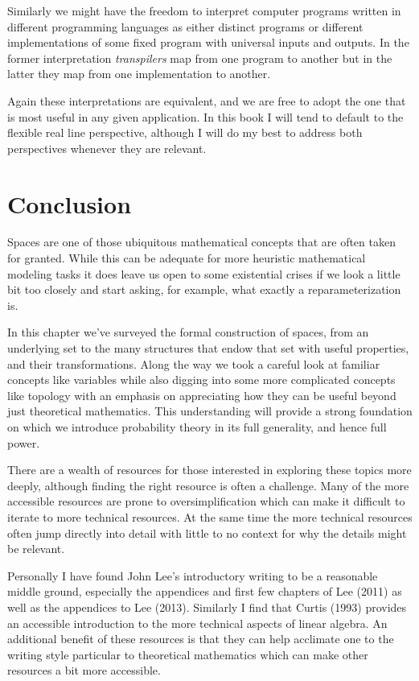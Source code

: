 \documentclass[
  letterpaper,
  DIV=11,
  numbers=noendperiod]{scrartcl}
\begin{document}
Similarly we might have the freedom to interpret computer programs
written in different programming languages as either distinct programs
or different implementations of some fixed program with universal inputs
and outputs. In the former interpretation \emph{transpilers} map from
one program to another but in the latter they map from one
implementation to another.

Again these interpretations are equivalent, and we are free to adopt the
one that is most useful in any given application. In this book I will
tend to default to the flexible real line perspective, although I will
do my best to address both perspectives whenever they are relevant.

\hypertarget{conclusion}{%
\section{Conclusion}\label{conclusion}}

Spaces are one of those ubiquitous mathematical concepts that are often
taken for granted. While this can be adequate for more heuristic
mathematical modeling tasks it does leave us open to some existential
crises if we look a little bit too closely and start asking, for
example, what exactly a reparameterization is.

In this chapter we've surveyed the formal construction of spaces, from
an underlying set to the many structures that endow that set with useful
properties, and their transformations. Along the way we took a careful
look at familiar concepts like variables while also digging into some
more complicated concepts like topology with an emphasis on appreciating
how they can be useful beyond just theoretical mathematics. This
understanding will provide a strong foundation on which we introduce
probability theory in its full generality, and hence full power.

There are a wealth of resources for those interested in exploring these
topics more deeply, although finding the right resource is often a
challenge. Many of the more accessible resources are prone to
oversimplification which can make it difficult to iterate to more
technical resources. At the same time the more technical resources often
jump directly into detail with little to no context for why the details
might be relevant.

Personally I have found John Lee's introductory writing to be a
reasonable middle ground, especially the appendices and first few
chapters of Lee (2011) as well as the appendices to Lee (2013).
Similarly I find that Curtis (1993) provides an accessible introduction
to the more technical aspects of linear algebra. An additional benefit
of these resources is that they can help acclimate one to the writing
style particular to theoretical mathematics which can make other
resources a bit more accessible.
\end{document}
